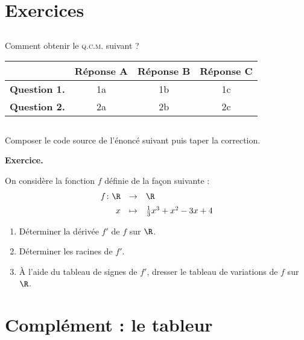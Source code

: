 \documentclass[10pt,french,openright,twoside]{book}
\begin{document}
\section{Exercices}
\subsection*{\ExoFiche}
Comment obtenir le \textsc{q.c.m.} suivant ?\medskip

\begin{CadreExemple}
\begin{center}
\begin{tabular}{|c|c|c|c|}
\hline
 & Réponse A & Réponse B & Réponse C \\
\hline\hline
 \textbf{Question 1.} & 1a & 1b & 1c \\
\hline
 \textbf{Question 2.} & 2a & 2b & 2c \\
\end{tabular}
\end{center}
\end{CadreExemple}

\subsection*{\ExoFiche}

Composer le code source de l'énoncé suivant puis taper la correction.\medskip

\begin{CadreExemple}
\textbf{Exercice.}\par
    On considère la fonction $f$ définie de la façon suivante :
        \[\begin{array}{rcl}
        f \colon \R & \rightarrow & \R \\[5pt]
                    x & \mapsto & \frac 13 x^3 + x^2 - 3x + 4
    \end{array}\]
    \begin{enumerate}
        \item Déterminer la dérivée $f'$ de $f$ sur $\R$.
        \item Déterminer les racines de $f'$.
        \item À l'aide du tableau de signes de $f'$, dresser le tableau de variations de $f$ sur $\R$.
    \end{enumerate}
\end{CadreExemple}


\section{Complément : le tableur}
\end{document}
